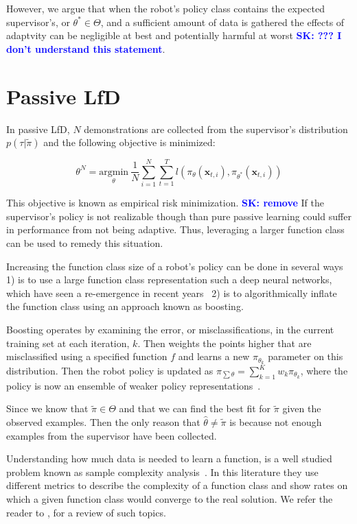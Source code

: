 \documentclass[10pt, conference]{ieeeconf}      %
\newcommand{\bx}{\mathbf{x}}
\newcommand{\sknote}[1]{%
 {\textcolor{blue}{\textbf{SK: #1}}}{}}
\begin{document}
However, we argue that when the robot's policy class contains the expected supervisor's, or  $\theta^* \in  \Theta$, and a sufficient amount of data is gathered the effects of adaptvity can be negligible at best and potentially harmful at worst \sknote{??? I don't understand this statement}. 

 

\section{Passive LfD}
In passive LfD, $N$ demonstrations are collected from the supervisor's distribution $p(\tau|\tilde{\pi})$ and the following objective is minimized: 

$$\theta^N = \underset{\theta}{\mbox{argmin}} \: \frac{1}{N} \sum^N_{i=1} \sum^T_{t=1} l(\pi_{\theta}(\bx_{t,i}), \pi_{\theta^*}(\bx_{t,i}))$$

This objective is known as empirical risk minimization.\sknote{remove}
If the supervisor's policy is not realizable though than pure passive learning could suffer in performance from not being adaptive. 
Thus, leveraging a larger function class can be used to remedy this situation. 

Increasing the function class size of a robot's policy can be done in several ways 1) is to use a large function class representation such a deep neural networks, which have seen a re-emergence in recent years~\cite{levine2015end} 2) is to algorithmically inflate the function class using an approach known as boosting.

Boosting operates by examining the error, or misclassifications, in the current training set at each iteration, $k$. Then weights the points higher that are misclassified using a specified function $f$ and learns a new $\pi_{\theta_k}$ parameter on this distribution.  Then the robot policy is updated as $\pi_{\sum \theta} = \sum^K_{k=1} w_k \pi_{\theta_k}$, where the policy is now an ensemble of weaker policy representations~\cite{mason1999boosting}.


Since we know that $\tilde{\pi} \in \Theta$ and that we can find the best fit for $\tilde{\pi}$ given the observed examples. Then the only reason that $\hat{\theta} \neq \tilde{\pi}$ is because not enough examples from the supervisor have been collected. 

Understanding how much data is needed to learn a function, is a well studied problem known as sample complexity analysis~\cite{anthony2009neural}. In this literature they use different metrics to describe the complexity of a function class and show rates on which a given function class would converge to the real solution. We refer the reader to \cite{vapnik2013nature}, for a review of such topics. 
\end{document}
